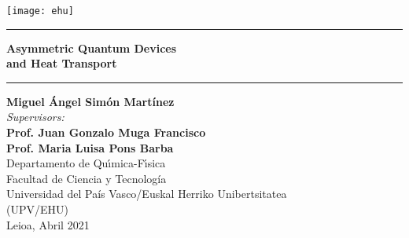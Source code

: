 \begin{titlepage}
\thispagestyle{empty} %
{\centering
\texttt{[image: ehu]}
}
\bigskip
{\centering \large
\par \vspace{1.5cm}

\hrule\vspace*{0.3cm}

{\LARGE \bf {Asymmetric Quantum Devices\\and Heat Transport}}

\vspace{0.3cm}\hrule \vspace{2cm}
{\LARGE \bf{Miguel \'{A}ngel Sim\'{o}n Mart\'{i}nez}}\\
\vspace{1.25cm}
{\it{Supervisors:}} \\
\vspace{0.1cm}
{\large \bf {Prof. Juan Gonzalo Muga Francisco}}\\
{\large \bf {Prof. Maria Luisa Pons Barba}}\\
\vfill
%
Departamento de Qu\'{\i}mica-F\'{\i}sica\\
Facultad de Ciencia y Tecnolog\'ia\\
Universidad del Pa\'is Vasco/Euskal Herriko Unibertsitatea\\ (UPV/EHU)\\
\vspace{1.0cm}
Leioa, Abril 2021\\
} \pagebreak
\end{titlepage}

